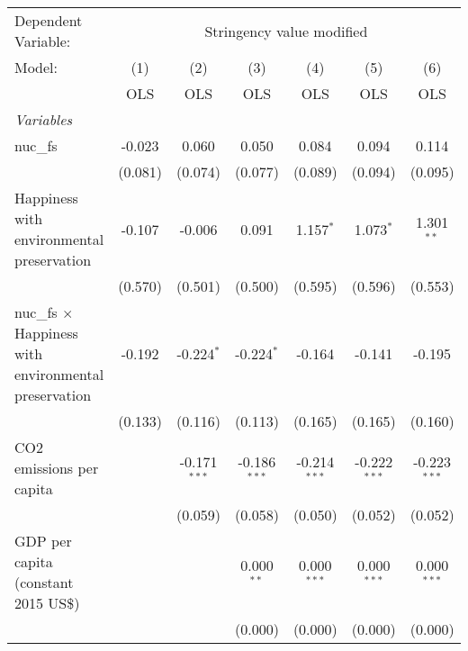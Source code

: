 
\begingroup
\centering
\begin{tabular}{lcccccc}
   \toprule
   Dependent Variable: & \multicolumn{6}{c}{Stringency value modified}\\
   Model:                                                       & (1)     & (2)            & (3)            & (4)            & (5)            & (6)\\  
                                                                &  OLS    & OLS            & OLS            & OLS            & OLS            & OLS\\  
   \midrule
   \emph{Variables}\\
   nuc\_fs                                                      & -0.023  & 0.060          & 0.050          & 0.084          & 0.094          & 0.114\\   
                                                                & (0.081) & (0.074)        & (0.077)        & (0.089)        & (0.094)        & (0.095)\\   
   Happiness with environmental preservation                    & -0.107  & -0.006         & 0.091          & 1.157$^{*}$    & 1.073$^{*}$    & 1.301$^{**}$\\   
                                                                & (0.570) & (0.501)        & (0.500)        & (0.595)        & (0.596)        & (0.553)\\   
   nuc\_fs $\times$ Happiness with environmental preservation   & -0.192  & -0.224$^{*}$   & -0.224$^{*}$   & -0.164         & -0.141         & -0.195\\   
                                                                & (0.133) & (0.116)        & (0.113)        & (0.165)        & (0.165)        & (0.160)\\   
   CO2 emissions per capita                                     &         & -0.171$^{***}$ & -0.186$^{***}$ & -0.214$^{***}$ & -0.222$^{***}$ & -0.223$^{***}$\\   
                                                                &         & (0.059)        & (0.058)        & (0.050)        & (0.052)        & (0.052)\\   
   GDP per capita (constant 2015 US\$)                          &         &                & 0.000$^{**}$   & 0.000$^{***}$  & 0.000$^{***}$  & 0.000$^{***}$\\   
                                                                &         &                & (0.000)        & (0.000)        & (0.000)        & (0.000)\\   

\end{tabular}
